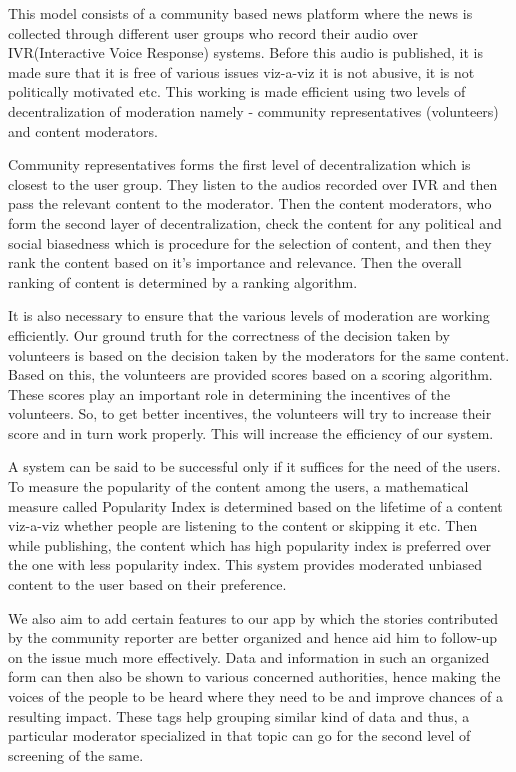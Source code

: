 \documentclass[11pt]{article}
\begin{document}
    
    This model consists of a community based news platform where the news is collected through different user groups who record their audio over IVR(Interactive Voice Response) systems. Before this audio is published, it is made sure that it is free of various issues viz-a-viz it is not abusive, it is not politically motivated etc. This working is made efficient using two levels of decentralization of moderation namely - community representatives (volunteers) and content moderators.

Community representatives forms the first level of decentralization which is closest to the user group. They listen to the audios recorded over IVR and then pass the relevant content to the moderator. Then the content moderators, who form the second layer of decentralization, check the content for any political and social biasedness which is procedure for the selection of content, and then they rank the content based on it's importance and relevance. Then the overall ranking of content is determined by a ranking algorithm.

It is also necessary to ensure that the various levels of moderation are working efficiently. Our ground truth for the correctness of the decision taken by volunteers is based on the decision taken by the moderators for the same content. Based on this, the volunteers are provided scores based on a scoring algorithm. These scores play an important role in determining the incentives of the volunteers. So, to get better incentives, the volunteers will try to increase their score and in turn work properly. This will increase the efficiency of our system.

A system can be said to be successful only if it suffices for the need of the users. To measure the popularity of the content among the users, a mathematical measure called Popularity Index is determined based on the lifetime of a content viz-a-viz whether people are listening to the content or skipping it etc. Then while publishing, the content which has high popularity index is preferred over the one with less popularity index. This system provides moderated unbiased content to the user based on their preference.

We also aim to add certain features to our app by which the stories contributed by
the community reporter are better organized and hence aid him to follow-up on the issue much more effectively. Data and information in such an organized form can then also be shown to various concerned authorities, hence making the voices of the people to be heard where they need to be and improve chances of a resulting impact. These tags help grouping similar kind of data and thus, a particular moderator specialized in that topic can go for the second level of screening of the same.
  \pagebreak  
\end{document}
